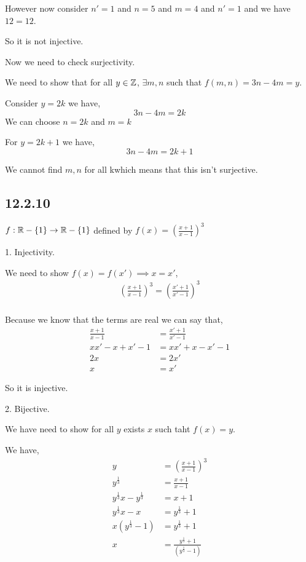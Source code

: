 \documentclass[a4paper]{report}
\begin{document}
However now consider $n' = 1$ and $n = 5$ and $m = 4$ and $n' = 1$ and we have  $12 = 12$. 

So it is not injective.


Now we need to check surjectivity.

We need to show that for all  $y \in \mathbb{Z}$, $\exists m,n$ such that $f(m,n) = 3n - 4m = y$.

Consider  $y = 2k$ we have,  
$$ 3n - 4m = 2k $$ We can choose $n = 2k$ and $m = k$

For $y = 2k + 1$ we have, 
$$ 3n - 4m = 2k + 1 $$ 

We cannot find $m,n$ for all kwhich means that this isn't surjective.




\subsection*{12.2.10}
$f: \mathbb{R} - \{1\} \rightarrow \mathbb{R} - \{1\}$ defined by  $f(x) = (\frac{x+1}{x-1})^{3}$ 

1. Injectivity.

We   need to show $f(x) = f(x') \implies x = x'$,  
\begin{align*}
(\frac{x + 1}{x - 1})^{3} = (\frac{x' + 1}{x' - 1})^{3}\\
\end{align*}

Because we know that the terms are real we can say that, 
\begin{align*}
    \frac{x + 1}{x - 1} &= \frac{x' + 1}{x' - 1}\\
    x x' - x + x' -1 &= x x' + x - x' - 1\\
    2x &= 2x'\\
    x &= x'
\end{align*}

So it is injective.

2. Bijective.

We have need to show for all $y$ exists $x$ such taht $f(x) = y$.

We have, 
\begin{align*}
    y &= (\frac{x + 1}{x - 1})^{3}\\
    y^{\frac{1}{3}} &= \frac{x + 1}{x - 1}\\
    y^{\frac{1}{3}}x - y^{\frac{1}{3}} &= x  +  1\\
    y^{\frac{1}{3}}x - x&=   y^{\frac{1}{3}} +  1\\
    x(y^{\frac{1}{3}} - 1)&=   y^{\frac{1}{3}} +  1\\
    x&=   \frac{y^{\frac{1}{3}} +  1}{(y^{\frac{1}{3}} - 1)}\\
\end{align*}
\end{document}
